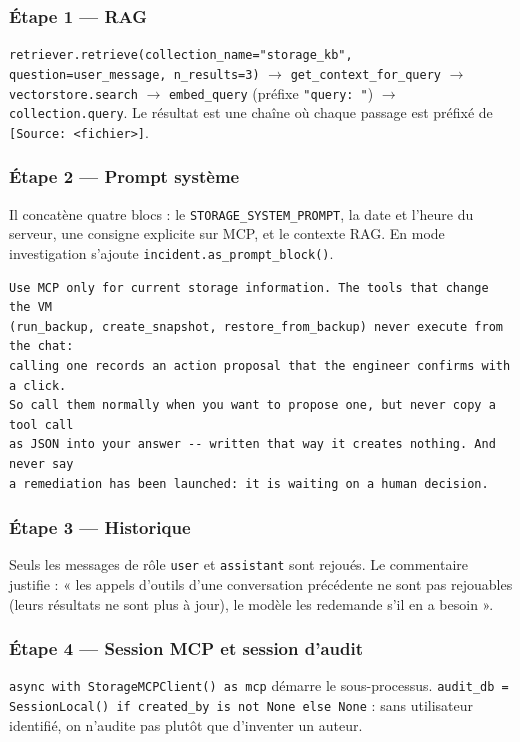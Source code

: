 \documentclass[11pt,a4paper]{report}
\newcommand{\fn}[1]{\texttt{\small\textcolor{oasisviolet}{#1}}}
\newcommand{\arrowto}{\ensuremath{\rightarrow}}
\begin{document}
\clearpage

\subsubsection*{Étape 1 --- RAG}
\fn{retriever.retrieve(collection\_name="storage\_kb", question=user\_message,
n\_results=3)} \arrowto{} \fn{get\_context\_for\_query} \arrowto{}
\fn{vectorstore.search} \arrowto{} \fn{embed\_query} (préfixe
\texttt{"query: "}) \arrowto{} \texttt{collection.query}. Le résultat est une
chaîne où chaque passage est préfixé de \texttt{[Source: <fichier>]}.

\subsubsection*{Étape 2 --- Prompt système}
Il concatène quatre blocs : le \fn{STORAGE\_SYSTEM\_PROMPT}, la date et l'heure
du serveur, une consigne explicite sur MCP, et le contexte RAG. En mode
investigation s'ajoute \fn{incident.as\_prompt\_block()}.

\begin{lstlisting}[caption={Consigne anti-hallucination injectée à chaque tour}]
Use MCP only for current storage information. The tools that change the VM
(run_backup, create_snapshot, restore_from_backup) never execute from the chat:
calling one records an action proposal that the engineer confirms with a click.
So call them normally when you want to propose one, but never copy a tool call
as JSON into your answer -- written that way it creates nothing. And never say
a remediation has been launched: it is waiting on a human decision.
\end{lstlisting}

\subsubsection*{Étape 3 --- Historique}
Seuls les messages de rôle \texttt{user} et \texttt{assistant} sont rejoués. Le
commentaire justifie : « les appels d'outils d'une conversation précédente ne
sont pas rejouables (leurs résultats ne sont plus à jour), le modèle les
redemande s'il en a besoin ».

\subsubsection*{Étape 4 --- Session MCP et session d'audit}
\texttt{async with StorageMCPClient() as mcp} démarre le sous-processus.
\texttt{audit\_db = SessionLocal() if created\_by is not None else None} : sans
utilisateur identifié, on n'audite pas plutôt que d'inventer un auteur.
\end{document}
